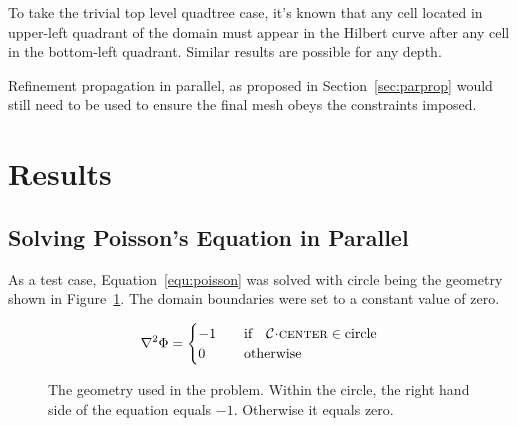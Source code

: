 \documentclass[twoside]{IIBproject}
\newcommand{\acc}{{\mkern 0.5mu\cdot\mkern 0.5mu}}
\numberwithin{figure}{section}
\begin{document}
            To take the trivial top level quadtree case, it's known that any cell located in upper-left quadrant of the domain must appear in the Hilbert curve after any cell in the bottom-left quadrant. Similar results are possible for any depth. 

            Refinement propagation in parallel, as proposed in Section~\ref{sec:parprop} would still need to be used to ensure the final mesh obeys the constraints imposed. 
 




\section{Results} %
    \label{sec:results}

    \subsection{Solving Poisson's Equation in Parallel} %
        \label{sec:results-poissons}

        As a test case, Equation~\ref{equ:poisson} was solved with circle being the geometry shown in Figure~\ref{fig:pois-geometry}. The domain boundaries were set to a constant value of zero.

        \begin{equation}
            \laplacian{\Phi}=\begin{cases}
                -1 & \qq{if} \mathcal{C}\acc\textproc{center} \in \text{circle} \\
                0 & \qq{otherwise}
            \end{cases}
            \label{equ:poisson}
        \end{equation}

        \begin{figure}[!htbp]
            \centering
            \caption{The geometry used in the problem. Within the circle, the right hand side of the equation equals ${-1}$. Otherwise it equals zero.}
            \label{fig:pois-geometry}
        \end{figure}
\end{document}
